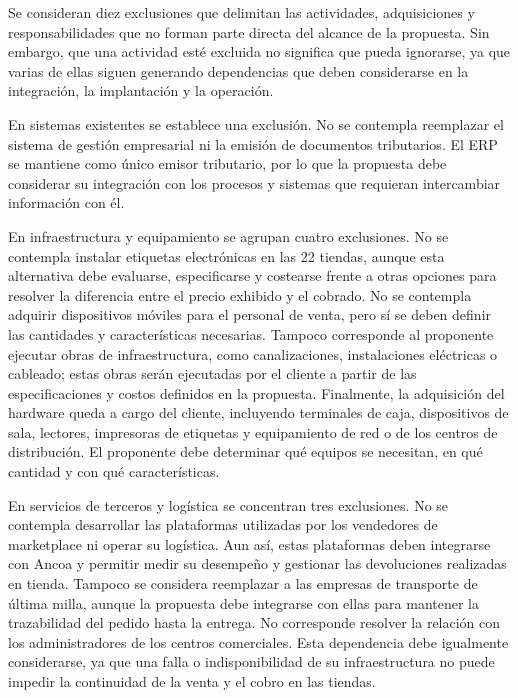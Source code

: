 \documentclass[11pt]{article}
\begin{document}
Se consideran diez exclusiones que delimitan las actividades, adquisiciones y responsabilidades que no forman parte directa del alcance de la propuesta. Sin embargo, que una actividad esté excluida no significa que pueda ignorarse, ya que varias de ellas siguen generando dependencias que deben considerarse en la integración, la implantación y la operación.

En sistemas existentes se establece una exclusión. No se contempla reemplazar el sistema de gestión empresarial ni la emisión de documentos tributarios. El ERP se mantiene como único emisor tributario, por lo que la propuesta debe considerar su integración con los procesos y sistemas que requieran intercambiar información con él.

En infraestructura y equipamiento se agrupan cuatro exclusiones. No se contempla instalar etiquetas electrónicas en las 22 tiendas, aunque esta alternativa debe evaluarse, especificarse y costearse frente a otras opciones para resolver la diferencia entre el precio exhibido y el cobrado. No se contempla adquirir dispositivos móviles para el personal de venta, pero sí se deben definir las cantidades y características necesarias. Tampoco corresponde al proponente ejecutar obras de infraestructura, como canalizaciones, instalaciones eléctricas o cableado; estas obras serán ejecutadas por el cliente a partir de las especificaciones y costos definidos en la propuesta. Finalmente, la adquisición del hardware queda a cargo del cliente, incluyendo terminales de caja, dispositivos de sala, lectores, impresoras de etiquetas y equipamiento de red o de los centros de distribución. El proponente debe determinar qué equipos se necesitan, en qué cantidad y con qué características.

En servicios de terceros y logística se concentran tres exclusiones. No se contempla desarrollar las plataformas utilizadas por los vendedores de marketplace ni operar su logística. Aun así, estas plataformas deben integrarse con Ancoa y permitir medir su desempeño y gestionar las devoluciones realizadas en tienda. Tampoco se considera reemplazar a las empresas de transporte de última milla, aunque la propuesta debe integrarse con ellas para mantener la trazabilidad del pedido hasta la entrega. No corresponde resolver la relación con los administradores de los centros comerciales. Esta dependencia debe igualmente considerarse, ya que una falla o indisponibilidad de su infraestructura no puede impedir la continuidad de la venta y el cobro en las tiendas.
\end{document}
